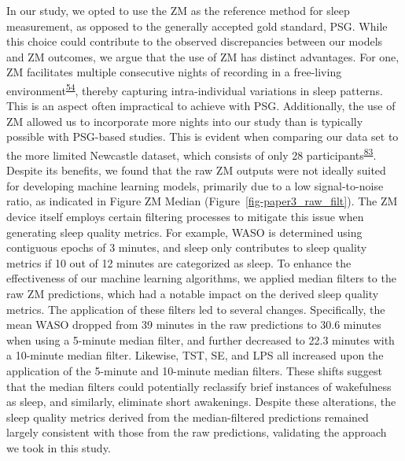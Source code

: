 \documentclass[
  10pt,
]{scrbook}
\begin{document}
In our study, we opted to use the ZM as the reference method for sleep
measurement, as opposed to the generally accepted gold standard, PSG.
While this choice could contribute to the observed discrepancies between
our models and ZM outcomes, we argue that the use of ZM has distinct
advantages. For one, ZM facilitates multiple consecutive nights of
recording in a free-living
environment\textsuperscript{\protect\hyperlink{ref-pedersen_self-administered_2021}{54}},
thereby capturing intra-individual variations in sleep patterns. This is
an aspect often impractical to achieve with PSG. Additionally, the use
of ZM allowed us to incorporate more nights into our study than is
typically possible with PSG-based studies. This is evident when
comparing our data set to the more limited Newcastle dataset, which
consists of only 28
participants\textsuperscript{\protect\hyperlink{ref-hees_novel_2015}{83}}.
Despite its benefits, we found that the raw ZM outputs were not ideally
suited for developing machine learning models, primarily due to a low
signal-to-noise ratio, as indicated in Figure ZM Median
(Figure~\ref{fig-paper3_raw_filt}). The ZM device itself employs certain
filtering processes to mitigate this issue when generating sleep quality
metrics. For example, WASO is determined using contiguous epochs of 3
minutes, and sleep only contributes to sleep quality metrics if 10 out
of 12 minutes are categorized as sleep. To enhance the effectiveness of
our machine learning algorithms, we applied median filters to the raw ZM
predictions, which had a notable impact on the derived sleep quality
metrics. The application of these filters led to several changes.
Specifically, the mean WASO dropped from 39 minutes in the raw
predictions to 30.6 minutes when using a 5-minute median filter, and
further decreased to 22.3 minutes with a 10-minute median filter.
Likewise, TST, SE, and LPS all increased upon the application of the
5-minute and 10-minute median filters. These shifts suggest that the
median filters could potentially reclassify brief instances of
wakefulness as sleep, and similarly, eliminate short awakenings. Despite
these alterations, the sleep quality metrics derived from the
median-filtered predictions remained largely consistent with those from
the raw predictions, validating the approach we took in this study.
\end{document}

